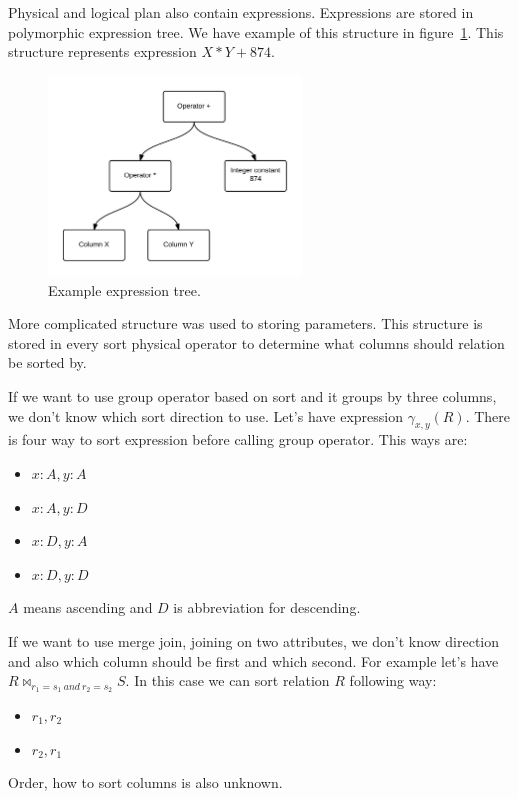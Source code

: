Physical and logical plan also contain expressions. Expressions are stored in polymorphic expression tree. We have example of this structure in figure~\ref*{fig:expressiontree}. This structure represents expression $X*Y+874$.
\begin{figure}[h!]
  \centering
    \includegraphics[width=0.6\textwidth]{expressiontree}

      \caption{Example expression tree.}
          \label{fig:expressiontree}
\end{figure}

More complicated structure was used to storing parameters. This structure is stored in every sort physical operator to determine what columns should relation be sorted by. 

If we want to use group operator based on sort and it groups by three columns, we don't know which sort direction to use. Let's have expression $\gamma_{x,y}(R)$. There is four way to sort expression before calling group operator. This ways are:
\begin{itemize}
\item $x:A,y:A$
\item $x:A,y:D$
\item $x:D,y:A$
\item $x:D,y:D$
\end{itemize}
$A$ means ascending and $D$ is abbreviation for descending.

If we want to use merge join, joining on two attributes, we don't know direction and also which column should be first and which second. For example let's have $R\Join_{r_1=s_1~and~r_2=s_2} S$. In this case we can sort relation $R$ following way:
\begin{itemize}
\item $r_1,r_2$
\item $r_2,r_1$
\end{itemize}
Order, how to sort columns is also unknown.

